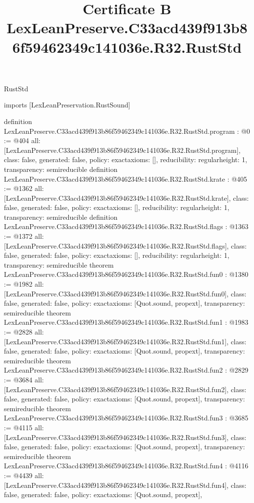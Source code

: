 \begin{lexlean}{RustStd}
\title{Certificate B LexLeanPreserve.C33acd439f913b86f59462349c141036e.R32.RustStd}
\begin{coremodule}
imports [LexLeanPreservation.RustSound]

definition LexLeanPreserve.C33acd439f913b86f59462349c141036e.R32.RustStd.program : @0 := @404 {
  all: [LexLeanPreserve.C33acd439f913b86f59462349c141036e.R32.RustStd.program],
  class: false,
  generated: false,
  policy: exact{axioms: []},
  reducibility: regular{height: 1},
  transparency: semireducible
}
definition LexLeanPreserve.C33acd439f913b86f59462349c141036e.R32.RustStd.krate : @405 := @1362 {
  all: [LexLeanPreserve.C33acd439f913b86f59462349c141036e.R32.RustStd.krate],
  class: false,
  generated: false,
  policy: exact{axioms: []},
  reducibility: regular{height: 1},
  transparency: semireducible
}
definition LexLeanPreserve.C33acd439f913b86f59462349c141036e.R32.RustStd.flags : @1363 := @1372 {
  all: [LexLeanPreserve.C33acd439f913b86f59462349c141036e.R32.RustStd.flags],
  class: false,
  generated: false,
  policy: exact{axioms: []},
  reducibility: regular{height: 1},
  transparency: semireducible
}
theorem LexLeanPreserve.C33acd439f913b86f59462349c141036e.R32.RustStd.fun0 : @1380 := @1982 {
  all: [LexLeanPreserve.C33acd439f913b86f59462349c141036e.R32.RustStd.fun0],
  class: false,
  generated: false,
  policy: exact{axioms: [Quot.sound, propext]},
  transparency: semireducible
}
theorem LexLeanPreserve.C33acd439f913b86f59462349c141036e.R32.RustStd.fun1 : @1983 := @2828 {
  all: [LexLeanPreserve.C33acd439f913b86f59462349c141036e.R32.RustStd.fun1],
  class: false,
  generated: false,
  policy: exact{axioms: [Quot.sound, propext]},
  transparency: semireducible
}
theorem LexLeanPreserve.C33acd439f913b86f59462349c141036e.R32.RustStd.fun2 : @2829 := @3684 {
  all: [LexLeanPreserve.C33acd439f913b86f59462349c141036e.R32.RustStd.fun2],
  class: false,
  generated: false,
  policy: exact{axioms: [Quot.sound, propext]},
  transparency: semireducible
}
theorem LexLeanPreserve.C33acd439f913b86f59462349c141036e.R32.RustStd.fun3 : @3685 := @4115 {
  all: [LexLeanPreserve.C33acd439f913b86f59462349c141036e.R32.RustStd.fun3],
  class: false,
  generated: false,
  policy: exact{axioms: [Quot.sound, propext]},
  transparency: semireducible
}
theorem LexLeanPreserve.C33acd439f913b86f59462349c141036e.R32.RustStd.fun4 : @4116 := @4439 {
  all: [LexLeanPreserve.C33acd439f913b86f59462349c141036e.R32.RustStd.fun4],
  class: false,
  generated: false,
  policy: exact{axioms: [Quot.sound, propext]},
}
\end{coremodule}
\end{lexlean}
